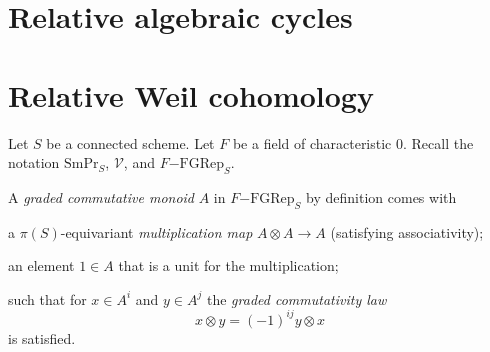 \documentclass[a4paper,10pt]{article}
\def\basepieces{\mathscr{V}}
\def\smpr{\mathrm{SmPr}}
\newcommand{\fgrep}[2]{#1\mathrm{-FGRep}_{#2}}
\def\tensor{\otimes}
\begin{document}
\section{Relative algebraic cycles}

\section{Relative Weil cohomology}

Let $S$ be a connected scheme. Let $F$ be a field of characteristic $0$. Recall
the notation $\smpr_{S}$, $\basepieces$, and $\fgrep{F}{S}$.

A \emph{graded commutative monoid} $A$ in $\fgrep{F}{S}$ by definition comes
with
\begin{enumerate*}[label=(\alph*)] %
	\item a $\pi(S)$-equivariant \emph{multiplication map} $A \tensor A \to
		A$ (satisfying associativity);
	\item an element $1 \in A$ that is a unit for the multiplication;
\end{enumerate*} %
such that for $x \in A^{i}$ and $y \in A^{j}$ the \emph{graded commutativity
law}
\[
	x \tensor y = (-1)^{ij} y \tensor x
\]
is satisfied.
\end{document}
